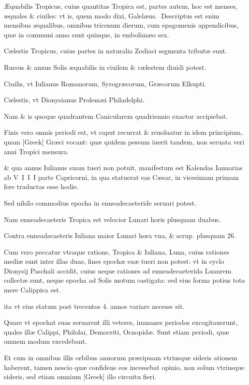 \begin{parnumbers}

Æquabilis Tropicus, cuius quantitas Tropica est, partes autem, hoc est menses, æquales \& ciuiles: vt is,  quem modo dixi, Galelæus.
Descriptus est enim mensibus æqualibus, omnibus tricenum dierum, cum epagomenis appendicibus, quæ in communi anno sunt quinque, in embolimæo sex.

Cælestis Tropicus, cuius partes in naturalia Zodiaci segmenta tributæ sunt.

Rursus \& annus Solis æquabilis in ciuilem \& cælestem diuidi potest.

Ciuilis, vt Iulianus Romanorum, Syrogræcorum, Græcorum Elkupti.

Cælestis, vt Dionysianus Prolemæi Philadelphi.

Nam \& is quoque quadrantem Canicularem quadriennio exactor accipiebat.

Finis vero omnis periodi est, vt caput recurrat \& reuoluatur in idem principium, quam \textgreek{[Greek]} Græci vocant: quæ quidem pessum iuerit tandem, non seruata veri anni Tropici mensura.

\& qua annus Iulianus  suam tueri non potuit, manifestum est Kalendas Ianuarias ab V I I I parte Capricorni, in qua statuerat eas Cæsar, in vicesimam primam fere traductas esse hodie.

Sed nihilo commodius epocha in enneadecaeteride seruari potest.

Nam enneadecaeteris Tropica est velocior Lunari horis plusquam duabus.

Contra enneadecaeteris Iuliana maior Lunari hora vna, \& scrup. plusquam 26.

Cum vero peccatur vtraque ratione, Tropica \& Iuliana, Luna, cuius rationes mediæ sunt inter illas duas, fines epochæ suæ tueri non potest: vt in cyclo Dionysij Paschali accidit, cuius neque rationes ad enneadecaeterida Luanrem collectæ sunt, neque epocha ad Solis motum castigata: sed eius forma potius tota mere Calippica est.

ita vt eius statum post trecentos  4. annos variare necesse sit.

Quare vt epochat suas seruarent illi veteres, immanes periodos excogitauerunt, quales illæ Calippi, Philolai, Democriti, Ocnopidæ. Sunt etiam periodi, quæ omnem modum excedebant.

Et cum in omnibus illis orbibus annorum præcipuam vtriusque sideris ationem haberent, tamen nescio quæ confidens eos incessebat opinio, non solum vtriusque sideris, sed etiam omnium \textgreek{[Greek]} illo circuitu fieri.


\end{parnumbers}
